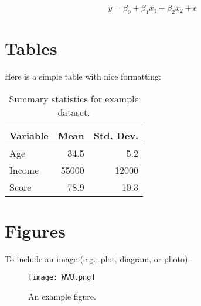 \documentclass[12pt]{article}
\begin{document}
\begin{equation*}
    \hat{y} = \beta_0 + \beta_1 x_1 + \beta_2 x_2 + \epsilon
\end{equation*}

\newpage


\section{Tables}

Here is a simple table with nice formatting:

\begin{table}[h] %
    \centering
    \begin{tabular}{lrr} %
        \toprule
        Variable & Mean & Std. Dev. \\
        \midrule
        Age      & 34.5 & 5.2 \\
        Income   & 55000 & 12000 \\
        \bottomrule
        Score    & 78.9 & 10.3 \\
    \end{tabular}
    \caption{Summary statistics for example dataset.}
    \label{tab:summary}
\end{table}

\section{Figures}

To include an image (e.g., plot, diagram, or photo):

\begin{figure}[h]
    \centering
    \texttt{[image: WVU.png]}
    \caption{An example figure.}
\end{figure}



\newpage

\end{document}
